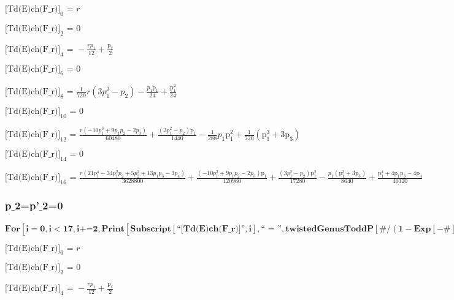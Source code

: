 \documentclass{article}
\newcommand{\unicode}[1]{{}}
\begin{document}
\noindent\(\text{[Td(E)ch(F$\_$r)]}_0\text{ = }r\)

\noindent\(\text{[Td(E)ch(F$\_$r)]}_2\text{ = }0\)

\noindent\(\text{[Td(E)ch(F$\_$r)]}_4\text{ = }-\frac{r p_1}{12}+\frac{\text{p$\unicode{02bc}$}_1}{2}\)

\noindent\(\text{[Td(E)ch(F$\_$r)]}_6\text{ = }0\)

\noindent\(\text{[Td(E)ch(F$\_$r)]}_8\text{ = }\frac{1}{720} r \left(3 p_1^2-p_2\right)-\frac{p_1 \text{p$\unicode{02bc}$}_1}{24}+\frac{\text{p$\unicode{02bc}$}_1^2}{24}\)

\noindent\(\text{[Td(E)ch(F$\_$r)]}_{10}\text{ = }0\)

\noindent\(\text{[Td(E)ch(F$\_$r)]}_{12}\text{ = }\frac{r \left(-10 p_1^3+9 p_1 p_2-2 p_3\right)}{60480}+\frac{\left(3 p_1^2-p_2\right) \text{p$\unicode{02bc}$}_1}{1440}-\frac{1}{288}
p_1 \text{p$\unicode{02bc}$}_1^2+\frac{1}{720} \left(\text{p$\unicode{02bc}$}_1^3+3 \text{p$\unicode{02bc}$}_3\right)\)

\noindent\(\text{[Td(E)ch(F$\_$r)]}_{14}\text{ = }0\)

\noindent\(\text{[Td(E)ch(F$\_$r)]}_{16}\text{ = }\frac{r \left(21 p_1^4-34 p_1^2 p_2+5 p_2^2+13 p_1 p_3-3 p_4\right)}{3628800}+\frac{\left(-10 p_1^3+9
p_1 p_2-2 p_3\right) \text{p$\unicode{02bc}$}_1}{120960}+\frac{\left(3 p_1^2-p_2\right) \text{p$\unicode{02bc}$}_1^2}{17280}-\frac{p_1 \left(\text{p$\unicode{02bc}$}_1^3+3
\text{p$\unicode{02bc}$}_3\right)}{8640}+\frac{\text{p$\unicode{02bc}$}_1^4+4 \text{p$\unicode{02bc}$}_1 \text{p$\unicode{02bc}$}_3-4 \text{p$\unicode{02bc}$}_4}{40320}\)

\subsubsection*{p$\_$2=p{'}$\_$2=0}

\begin{doublespace}
\noindent\(\pmb{\text{For}\left[i=0,i<17,i\text{+=}2, \text{Print}\left[\text{Subscript}[\text{{``}[Td(E)ch(F$\_$r)]{''}},i],\text{{``} = {''}},\text{twistedGenusToddP}[\#/(1-\text{Exp}[-\#])\&,i]\text{/.}p_2\to
0\text{/.}\text{p$\unicode{02bc}$}_2\to 0\right]\right]}\)
\end{doublespace}

\noindent\(\text{[Td(E)ch(F$\_$r)]}_0\text{ = }r\)

\noindent\(\text{[Td(E)ch(F$\_$r)]}_2\text{ = }0\)

\noindent\(\text{[Td(E)ch(F$\_$r)]}_4\text{ = }-\frac{r p_1}{12}+\frac{\text{p$\unicode{02bc}$}_1}{2}\)
\end{document}
